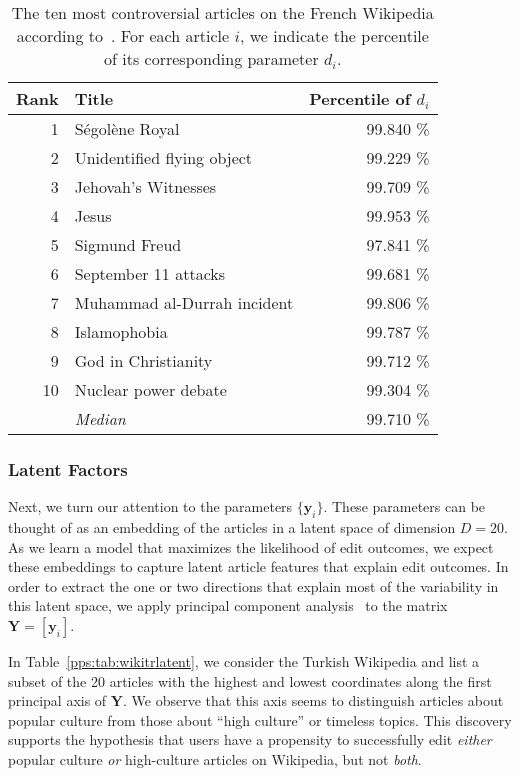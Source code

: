 \begin{table}
	\centering
	\caption{The ten most controversial articles on the French Wikipedia according to~\citet{yasseri2014most}.
		For each article $i$, we indicate the percentile of its corresponding parameter $d_i$.}
	\label{pps:tab:wikicontrov}
	\begin{tabular}{rlr}
		\toprule
		Rank & Title                       & Percentile of $d_i$ \\
		\midrule
		1    & Ségolène Royal              & \num{99.840} \%     \\
		2    & Unidentified flying object  & \num{99.229} \%     \\
		3    & Jehovah's Witnesses         & \num{99.709} \%     \\
		4    & Jesus                       & \num{99.953} \%     \\
		5    & Sigmund Freud               & \num{97.841} \%     \\
		6    & September 11 attacks        & \num{99.681} \%     \\
		7    & Muhammad al-Durrah incident & \num{99.806} \%     \\
		8    & Islamophobia                & \num{99.787} \%     \\
		9    & God in Christianity         & \num{99.712} \%     \\
		10   & Nuclear power debate        & \num{99.304} \%     \\
		\addlinespace
		     & \emph{Median}               & \num{99.710} \%     \\
		\bottomrule
	\end{tabular}
\end{table}

\subsubsection{Latent Factors}

Next, we turn our attention to the parameters $\{ \bm{y}_i \}$.
These parameters can be thought of as an embedding of the articles in a latent space of dimension $D = 20$.
As we learn a model that maximizes the likelihood of edit outcomes, we expect these embeddings to capture latent article features that explain edit outcomes.
In order to extract the one or two directions that explain most of the variability in this latent space, we apply principal component analysis~\citep{bishop2006pattern} to the matrix $\bm{Y} = [\bm{y}_i]$.

In Table~\ref{pps:tab:wikitrlatent}, we consider the Turkish Wikipedia and list a subset of the \num{20} articles with the highest and lowest coordinates along the first principal axis of $\bm{Y}$.
We observe that this axis seems to distinguish articles about popular culture from those about ``high culture'' or timeless topics.
This discovery supports the hypothesis that users have a propensity to successfully edit \emph{either} popular culture \emph{or} high-culture articles on Wikipedia, but not \emph{both}.

